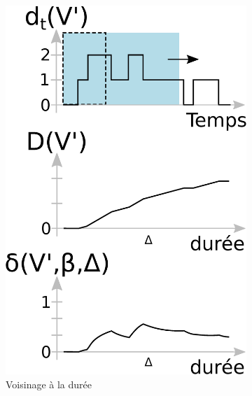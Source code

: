 \begin{figure}
\centering
	\begin{subfigure}{0.4\textwidth}
		\includegraphics[width=\linewidth]{img/GroupeDense/duration.eps}
		\caption{Voisinage à la durée}
		\label{fig:calcul_var_dure}
	\end{subfigure}\hspace*{0.05\textwidth}
	\begin{subfigure}{0.4\textwidth}

\end{subfigure}
\end{figure}
